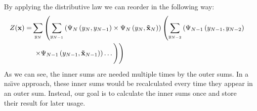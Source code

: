 \bigskip

By applying the distributive law we can reorder  in the following way:
\begin{equation}
  \label{equ:linear-chain-crf-z-distributive}
  \begin{split}
    Z(\mathbf{x}) = & \sum_{y_N}\left(\sum_{y_{N-1}}\left(\Psi_N\left(\vphantom{\tilde{x}}y_N,y_{N-1}\right)\times\Psi_N\left(y_N,\mathbf{\tilde{x}}_N\right)\right)\left(\sum_{y_{N-2}}\left(\Psi_{N-1}\left(\vphantom{\tilde{x}}y_{N-1},y_{N-2}\right)\right.\right.\right.\\
    & \left.\left.\left.\times\Psi_{N-1}\left(y_{N-1},\mathbf{\tilde{x}}_{N-1}\right)\right)\dots\vphantom{\sum_{y_N}}\right)\right)
  \end{split}
\end{equation}
As we can see, the inner sums are needed multiple times by the outer sums.
In a na\"{\i}ve approach, these inner sums would be recalculated every time they appear in an outer sum.
Instead, our goal is to calculate the inner sums once and store their result for later usage.

\bigskip

